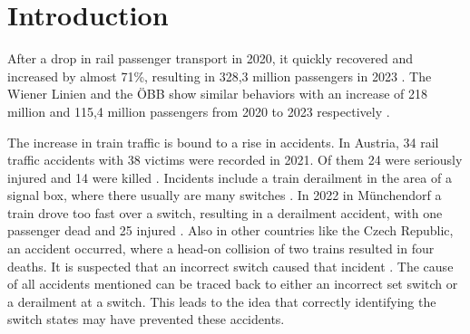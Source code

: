 \chapter{Introduction}
\label{sec:introduction}

After a drop in rail passenger transport in 2020, it quickly recovered and increased by almost 71\%, resulting in 328,3 million passengers in 2023 \cite{schienenpersonenverkehrAustria}.
The Wiener Linien and the ÖBB show similar behaviors with an increase of 218 million and 115,4 million passengers from 2020 to 2023 respectively \cite{wienerLinienAustria} \cite{oebbAustria}.

The increase in train traffic is bound to a rise in accidents.
In Austria, 34 rail traffic accidents with 38 victims were recorded in 2021.
Of them 24 were seriously injured and 14 were killed \cite{verkehrstatistik2022}.
Incidents include a train derailment in the area of a signal box, where there usually are many switches \cite{zugEntgleist}.
In 2022 in Münchendorf a train drove too fast over a switch, resulting in a derailment accident, with one passenger dead and 25 injured \cite{zugUnfall1Tod}.
Also in other countries like the Czech Republic, an accident occurred, where a head-on collision of two trains resulted in four deaths.
It is suspected that an incorrect switch caused that incident \cite{zugUnfallFrontal}.
The cause of all accidents mentioned can be traced back to either an incorrect set switch or a derailment at a switch.
This leads to the idea that correctly identifying the switch states may have prevented these accidents.

